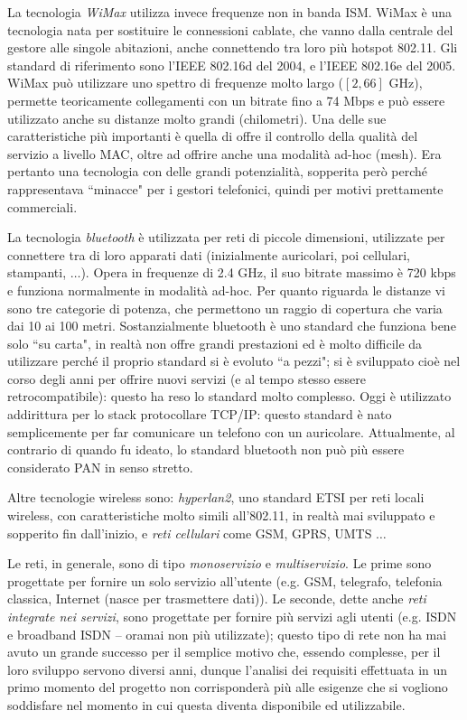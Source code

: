 La tecnologia \textit{WiMax} utilizza invece frequenze non in banda ISM. WiMax è una tecnologia nata per sostituire le connessioni cablate, che vanno dalla centrale del gestore alle singole abitazioni, anche connettendo tra loro più hotspot 802.11. Gli standard di riferimento sono l'IEEE 802.16d del 2004, e l'IEEE 802.16e del 2005. WiMax può utilizzare uno spettro di frequenze molto largo ($[2, 66]$ GHz), permette teoricamente collegamenti con un bitrate fino a 74 Mbps e può essere utilizzato anche su distanze molto grandi (chilometri). Una delle sue caratteristiche più importanti è quella di offre il controllo della qualità del servizio a livello MAC, oltre ad offrire anche una modalità ad-hoc (mesh). Era pertanto una tecnologia con delle grandi potenzialità, sopperita però perché rappresentava \textquotedblleft minacce" per i gestori telefonici, quindi per motivi prettamente commerciali.

La tecnologia \textit{bluetooth} è utilizzata per reti di piccole dimensioni, utilizzate per connettere tra di loro apparati dati (inizialmente auricolari, poi cellulari, stampanti, $\dots$). Opera in frequenze di 2.4 GHz, il suo bitrate massimo è 720 kbps e funziona normalmente in modalità ad-hoc. Per quanto riguarda le distanze vi sono tre categorie di potenza, che permettono un raggio di copertura che varia dai 10 ai 100 metri. Sostanzialmente bluetooth è uno standard che funziona bene solo \textquotedblleft su carta", in realtà non offre grandi prestazioni ed è molto difficile da utilizzare perché il proprio standard si è evoluto \textquotedblleft a pezzi"; si è sviluppato cioè nel corso degli anni per offrire nuovi servizi (e al tempo stesso essere retrocompatibile): questo ha reso lo standard molto complesso. Oggi è utilizzato addirittura per lo stack protocollare TCP/IP: questo standard è nato semplicemente per far comunicare un telefono con un auricolare. Attualmente, al contrario di quando fu ideato, lo standard bluetooth non può più essere considerato PAN in senso stretto.

Altre tecnologie wireless sono: \textit{hyperlan2}, uno standard ETSI per reti locali wireless, con caratteristiche molto simili all'802.11, in realtà mai sviluppato e sopperito fin dall'inizio, e \textit{reti cellulari} come GSM, GPRS, UMTS $\dots$

Le reti, in generale, sono di tipo \textit{monoservizio} e \textit{multiservizio}. Le prime sono progettate per fornire un solo servizio all'utente (e.g. GSM, telegrafo, telefonia classica, Internet (nasce per trasmettere dati)). Le seconde, dette anche \textit{reti integrate nei servizi}, sono progettate per fornire più servizi agli utenti (e.g. ISDN e broadband ISDN -- oramai non più utilizzate); questo tipo di rete non ha mai avuto un grande successo per il semplice motivo che, essendo complesse, per il loro sviluppo servono diversi anni, dunque l'analisi dei requisiti effettuata in un primo momento del progetto non corrisponderà più alle esigenze che si vogliono soddisfare nel momento in cui questa diventa disponibile ed utilizzabile.

